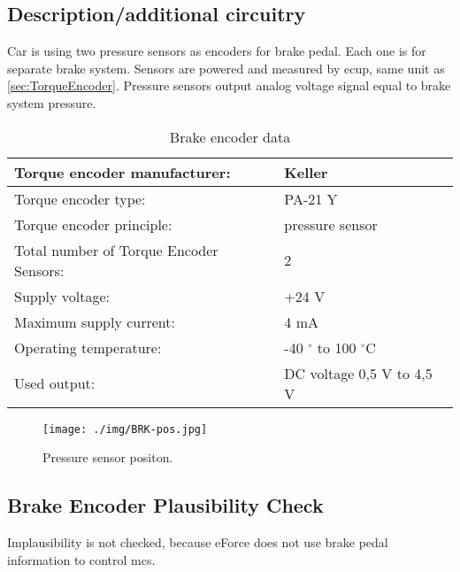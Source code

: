 \subsection{Description/additional circuitry}
Car is using two pressure sensors as encoders for brake pedal. Each one is for separate brake system. Sensors are powered and measured by \gls{ecup}, same unit as \ref{sec:TorqueEncoder}. Pressure sensors output analog voltage signal equal to brake system pressure. 


\begin{table}[H]
	\centering
	\caption{Brake encoder data}
	\begin{tabularx}{\textwidth}{|X|X|}
		\hline
		Torque encoder manufacturer: &  Keller \\[\TableSize]\hline
		Torque encoder type: & PA-21 Y \\[\TableSize]\hline
		Torque encoder principle: & pressure sensor \\[\TableSize]\hline
		Total number of Torque Encoder Sensors: & 2 \\[\TableSize]\hline
		Supply voltage: & +24 V \\[\TableSize]\hline
		Maximum supply current: &  4 mA  \\[\TableSize]\hline
		Operating temperature: & -40 $^\circ$ to 100 $^\circ$C \\[\TableSize]\hline
		Used output: & DC voltage 0,5 V to 4,5 V \\[\TableSize]\hline
	\end{tabularx}%
	\label{tab:brake-general}%
\end{table}%

\begin{figure}[H]
	\begin{center}
		\texttt{[image: ./img/BRK-pos.jpg]}
		\caption{Pressure sensor positon.}
		\label{fig:brake_pressure_position}
	\end{center}
\end{figure}

\subsection{Brake Encoder Plausibility Check}
Implausibility is not checked, because eForce does not use brake pedal information to control \glspl{mc}.

%
%




